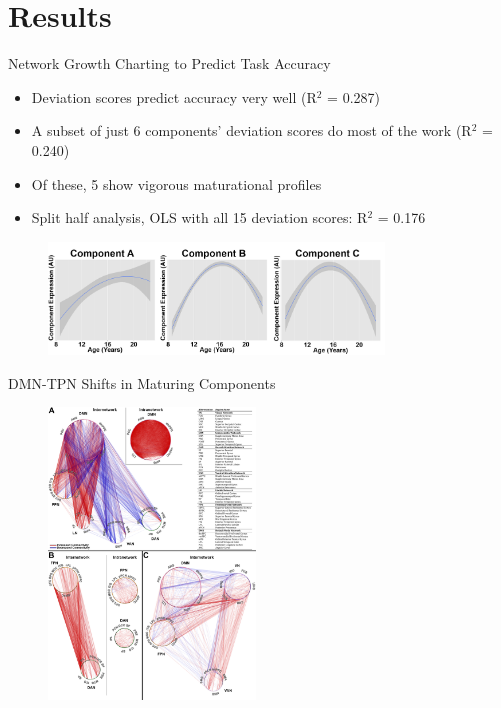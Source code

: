 \documentclass[presentation]{beamer}
\begin{document}
\section{Results}
\label{sec:orgheadline23}
\begin{frame}[label={sec:orgheadline18}]{Network Growth Charting to Predict Task Accuracy}
\begin{itemize}
\item \alert{Deviation scores} predict accuracy very well (R\(^{\text{2}}\) = 0.287)
\item A subset of just 6 components' \alert{deviation scores} do most of the work (R\(^{\text{2}}\) = 0.240)
\item Of these, 5 show vigorous maturational profiles
\item Split half analysis, OLS with all 15 \alert{deviation scores}: R\(^{\text{2}}\) = 0.176
\end{itemize}
\begin{figure}[htb]
\centering
\includegraphics[height=3cm]{./Figure3.png}
\end{figure}
\end{frame}
\begin{frame}[label={sec:orgheadline19}]{DMN-TPN Shifts in Maturing Components}
\begin{figure}[htb]
\centering
\includegraphics[height=7.75cm]{./Figure2.png}
\end{figure}
\end{frame}
\end{document}
